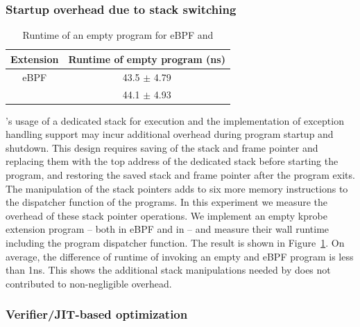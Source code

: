\subsubsection{Startup overhead due to stack switching}
\begin{table}[t]
    \small
    \centering
    \begin{tabular}{cc}%
        \toprule
        \textbf{Extension} & \textbf{Runtime of empty program (ns)} \\
        \midrule
        eBPF & 43.5 $\pm$ 4.79 \\
        \projname{} & 44.1 $\pm$ 4.93 \\
        \bottomrule
    \end{tabular}
    \caption{Runtime of an empty program for eBPF and \projname{}}
    \vspace{-10pt}
    \label{fig:startup-overhead}
\end{table}

\projname{}'s usage of a dedicated stack for execution and the implementation
    of exception handling support may incur additional overhead during program
    startup and shutdown.
This design requires saving of the stack and frame pointer and replacing them
    with the top address of the dedicated stack before starting the program,
    and restoring the saved stack and frame pointer after the program exits.
The manipulation of the stack pointers adds to six more memory instructions to
    the dispatcher function of the \projname{} programs.
In this experiment we measure the overhead of these stack pointer operations.
We implement an empty kprobe extension program -- both in eBPF and in
    \projname{} -- and measure their wall runtime including the program
    dispatcher function.
The result is shown in Figure~\ref{fig:startup-overhead}.
On average, the difference of runtime of invoking an empty \projname{} and eBPF
    program is less than 1ns.
This shows the additional stack manipulations needed by \projname{} does not
    contributed to non-negligible overhead.

\subsubsection{Verifier/JIT-based optimization}
\label{eval:inline}


